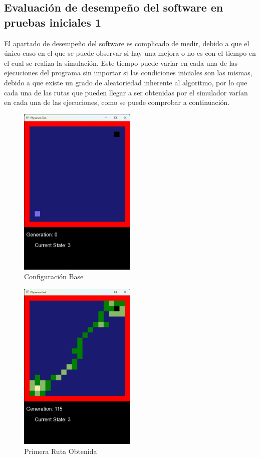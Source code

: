 \subsection{Evaluaci\'on de desempe\~no del software en pruebas iniciales 1}
    El apartado de desempe\~no del software es complicado de
        medir, debido a que el \'unico caso en el que se puede
        observar si hay una mejora o no es con el tiempo en el cual
        se realiza la simulaci\'on.
    \vskip 0.5cm
    Este tiempo puede variar en cada una de las ejecuciones del
        programa sin importar si las condiciones iniciales son las
        mismas, debido a que existe un grado de aleatoriedad
        inherente al algoritmo, por lo que cada una de las rutas que
        pueden llegar a ser obtenidas por el simulador var\'ian en cada
        una de las ejecuciones, como se puede comprobar a
        continuaci\'on.
    \vskip 0.5cm
    \begin{figure}[htbp]
        \centering
        \includegraphics[width=0.5\textwidth]{./images/Pruebas/simulador/image009.png}
        \caption{Configuraci\'on Base}
        \label{fig:Ruta 1}
    \end{figure}
    \vskip 0.5cm
    \begin{figure}[htbp]
        \centering
        \includegraphics[width=0.5\textwidth]{./images/Pruebas/simulador/image011.png}
        \caption{Primera Ruta Obtenida}
        \label{fig:Ruta 2}
    \end{figure}
